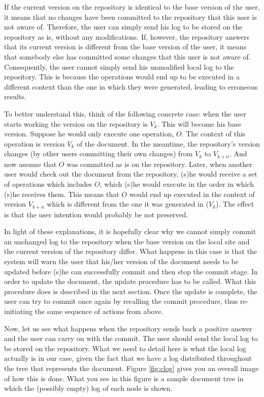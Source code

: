 If the current version on the repository is identical to the base version of the
user, it means that no changes have been committed to the repository that this user is not aware
of. Therefore, the user can simply send his log to be stored on the repository as is,
without any modifications. If, however, the repository answers that its current version is
different from the base version of the user, it means that somebody else has committed some
changes that this user is not aware of. Consequently, the user cannot simply send his unmodified
local log to the repository. This is because the operations would end up to be executed in
a different context than the one in which they were generated, leading to erroneous results.

To better understand this, think of the following concrete case: when the user starts working
the version on the repository is $V_{k}$. This will become his base version. Suppose he would
only execute one operation, $O$. The context of this operation is version $V_{k}$ of the document.
In the meantime, the repository's version changes (by other users committing their own changes)
from $V_{k}$ to $V_{k+n}$. And now assume that $O$ was committed as is on the repository. Later,
when another user would check out the document from the repository, (s)he would receive a set
of operations which includes $O$, which (s)he would execute in the order in which (s)he receives
them. This means that $O$ would end up executed in the context of version $V_{k+n}$ which is
different from the one it was generated in ($V_{k}$). The effect is that the user intention would
probably be not preserved.

In light of these explanations, it is hopefully clear why we cannot simply commit an unchanged
log to the repository when the base version on the local site and the current version of the
repository differ. What happens in this case is that the system will warn the user that his/her
version of the document needs to be updated before (s)he can successfully commit and then stop
the commit stage. In order to update the document, the update procedure has to be called. What
this procedure does is described in the next section. Once the update is complete, the user
can try to commit once again by recalling the commit procedure, thus re-initiating the same
sequence of actions from above.

Now, let us see what happens when the repository sends back a positive answer and the user can
carry on with the commit. The user should send the local log to be stored on the repository.
What we need to detail here is what the local log actually is in our case, given
the fact that we have a log distributed throughout the tree that represents the document. Figure
\ref {fig:clog} gives you an overall image of how this is done. What you see in this figure is
a sample document tree in which the (possibly empty) log of each node is shown.

